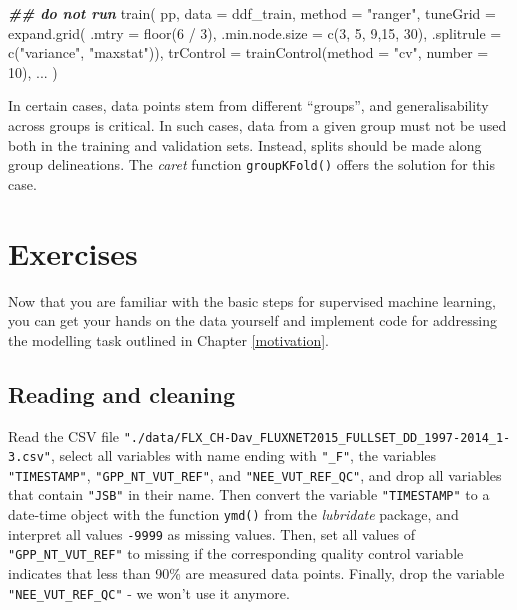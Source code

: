 \documentclass[
]{book}
\newenvironment{Shaded}{\begin{snugshade}}{\end{snugshade}}
\newcommand{\AttributeTok}[1]{\textcolor[rgb]{0.77,0.63,0.00}{#1}}
\newcommand{\DecValTok}[1]{\textcolor[rgb]{0.00,0.00,0.81}{#1}}
\newcommand{\DocumentationTok}[1]{\textcolor[rgb]{0.56,0.35,0.01}{\textbf{\textit{#1}}}}
\newcommand{\FunctionTok}[1]{\textcolor[rgb]{0.00,0.00,0.00}{#1}}
\newcommand{\NormalTok}[1]{#1}
\newcommand{\SpecialCharTok}[1]{\textcolor[rgb]{0.00,0.00,0.00}{#1}}
\newcommand{\StringTok}[1]{\textcolor[rgb]{0.31,0.60,0.02}{#1}}
\begin{document}
\begin{Shaded}
\begin{Highlighting}[]
\DocumentationTok{\#\# do not run}
\FunctionTok{train}\NormalTok{(}
\NormalTok{  pp, }
  \AttributeTok{data =}\NormalTok{ ddf\_train, }
  \AttributeTok{method =} \StringTok{"ranger"}\NormalTok{,}
  \AttributeTok{tuneGrid =} \FunctionTok{expand.grid}\NormalTok{( }\AttributeTok{.mtry =} \FunctionTok{floor}\NormalTok{(}\DecValTok{6} \SpecialCharTok{/} \DecValTok{3}\NormalTok{),}
                          \AttributeTok{.min.node.size =} \FunctionTok{c}\NormalTok{(}\DecValTok{3}\NormalTok{, }\DecValTok{5}\NormalTok{, }\DecValTok{9}\NormalTok{,}\DecValTok{15}\NormalTok{, }\DecValTok{30}\NormalTok{),}
                          \AttributeTok{.splitrule =} \FunctionTok{c}\NormalTok{(}\StringTok{"variance"}\NormalTok{, }\StringTok{"maxstat"}\NormalTok{)),}
  \AttributeTok{trControl =} \FunctionTok{trainControl}\NormalTok{(}\AttributeTok{method =} \StringTok{"cv"}\NormalTok{, }\AttributeTok{number =} \DecValTok{10}\NormalTok{),}
\NormalTok{  ...}
\NormalTok{)}
\end{Highlighting}
\end{Shaded}

In certain cases, data points stem from different ``groups'', and generalisability across groups is critical. In such cases, data from a given group must not be used both in the training and validation sets. Instead, splits should be made along group delineations. The \emph{caret} function \texttt{groupKFold()} offers the solution for this case.

\hypertarget{exercises}{%
\chapter{Exercises}\label{exercises}}

Now that you are familiar with the basic steps for supervised machine learning, you can get your hands on the data yourself and implement code for addressing the modelling task outlined in Chapter \ref{motivation}.

\hypertarget{reading-and-cleaning}{%
\section{Reading and cleaning}\label{reading-and-cleaning}}

Read the CSV file \texttt{"./data/FLX\_CH-Dav\_FLUXNET2015\_FULLSET\_DD\_1997-2014\_1-3.csv"}, select all variables with name ending with \texttt{"\_F"}, the variables \texttt{"TIMESTAMP"}, \texttt{"GPP\_NT\_VUT\_REF"}, and \texttt{"NEE\_VUT\_REF\_QC"}, and drop all variables that contain \texttt{"JSB"} in their name. Then convert the variable \texttt{"TIMESTAMP"} to a date-time object with the function \texttt{ymd()} from the \emph{lubridate} package, and interpret all values \texttt{-9999} as missing values. Then, set all values of \texttt{"GPP\_NT\_VUT\_REF"} to missing if the corresponding quality control variable indicates that less than 90\% are measured data points. Finally, drop the variable \texttt{"NEE\_VUT\_REF\_QC"} - we won't use it anymore.
\end{document}
